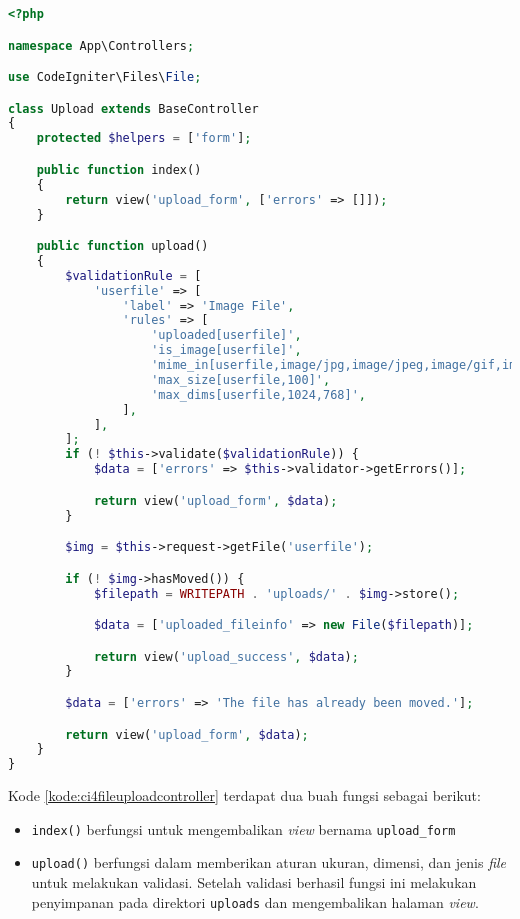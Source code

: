 \begin{lstlisting}[language=PHP, caption=Contoh kode \textit{controller} untuk melakukan validasi dan penyimpanan. ,label=kode:ci4fileuploadcontroller]
<?php

namespace App\Controllers;

use CodeIgniter\Files\File;

class Upload extends BaseController
{
    protected $helpers = ['form'];

    public function index()
    {
        return view('upload_form', ['errors' => []]);
    }

    public function upload()
    {
        $validationRule = [
            'userfile' => [
                'label' => 'Image File',
                'rules' => [
                    'uploaded[userfile]',
                    'is_image[userfile]',
                    'mime_in[userfile,image/jpg,image/jpeg,image/gif,image/png,image/webp]',
                    'max_size[userfile,100]',
                    'max_dims[userfile,1024,768]',
                ],
            ],
        ];
        if (! $this->validate($validationRule)) {
            $data = ['errors' => $this->validator->getErrors()];

            return view('upload_form', $data);
        }

        $img = $this->request->getFile('userfile');

        if (! $img->hasMoved()) {
            $filepath = WRITEPATH . 'uploads/' . $img->store();

            $data = ['uploaded_fileinfo' => new File($filepath)];

            return view('upload_success', $data);
        }

        $data = ['errors' => 'The file has already been moved.'];

        return view('upload_form', $data);
    }
}
\end{lstlisting}
Kode \ref{kode:ci4fileuploadcontroller} terdapat dua buah fungsi sebagai berikut:
\begin{itemize}
\item \verb|index()| berfungsi untuk mengembalikan \textit{view} bernama \texttt{upload\_form}
\item \verb|upload()| berfungsi dalam memberikan aturan ukuran, dimensi, dan jenis \textit{file} untuk melakukan validasi. Setelah validasi berhasil fungsi ini melakukan penyimpanan pada direktori \texttt{uploads} dan mengembalikan halaman \textit{view}.
\end{itemize}

